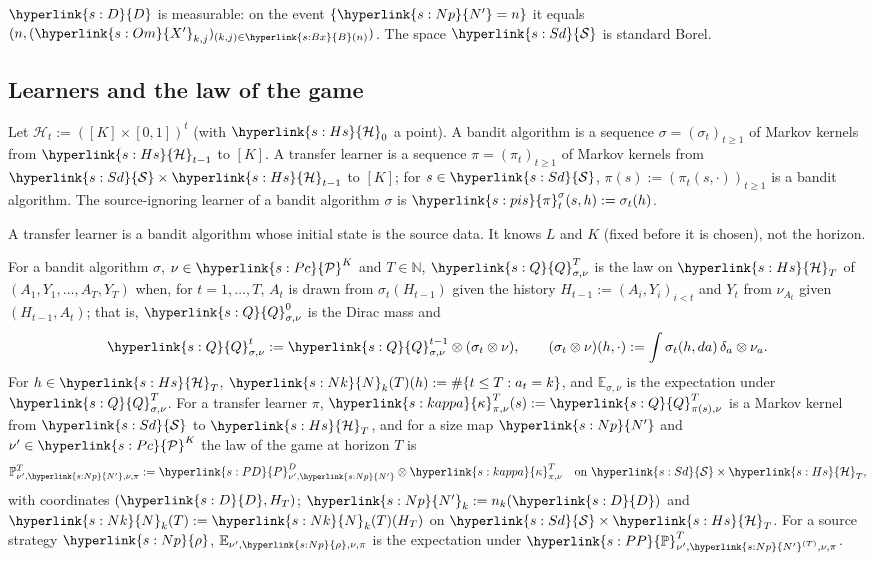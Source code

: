 \documentclass[11pt]{article}
\newcommand{\dt}[1]{\hypertarget{#1}{}}
\newcommand{\sy}[2]{\hyperlink{#1}{#2}}
\newcommand{\E}{\mathbb{E}}
\newcommand{\PP}{\sy{s:PP}{\mathbb{P}}}
\newcommand{\N}{\mathbb{N}}
\newcommand{\Pc}{\sy{s:Pc}{\mathcal{P}}}
\newcommand{\Sd}{\sy{s:Sd}{\mathcal{S}}}
\newcommand{\Bx}{\sy{s:Bx}{B}}
\newcommand{\Hs}{\sy{s:Hs}{\mathcal{H}}}
\newcommand{\Np}{\sy{s:Np}{N'}}
\newcommand{\rhos}{\sy{s:Np}{\rho}}
\newcommand{\Dd}{\sy{s:D}{D}}
\newcommand{\PD}{\sy{s:PD}{P}^{D}}
\newcommand{\Q}{\sy{s:Q}{Q}}
\newcommand{\kap}{\sy{s:kappa}{\kappa}}
\newcommand{\Nc}{\sy{s:Nk}{N}}
\newcommand{\Xp}{\sy{s:Om}{X'}}
\newcommand{\pis}{\sy{s:pis}{\pi}^{\sigma}}
\begin{document}
$\Dd$ is measurable: on the event $\{\Np=n\}$ it equals $(n,(\Xp_{k,j})_{(k,j)\in\Bx(n)})$. The space
$\Sd$ is standard Borel.

\subsection{Learners and the law of the game}\label{sec:setting-game}

\begin{definition}\label{def:learner}
Let \dt{s:Hs}$\mathcal H_t:=([K]\times[0,1])^{t}$ (with $\Hs_0$ a point). A bandit algorithm is a
sequence $\sigma=(\sigma_t)_{t\ge1}$ of Markov kernels from $\Hs_{t-1}$ to $[K]$. A transfer learner
is a sequence $\pi=(\pi_t)_{t\ge1}$ of Markov kernels from $\Sd\times\Hs_{t-1}$ to $[K]$; for
$s\in\Sd$, $\pi(s):=(\pi_t(s,\cdot))_{t\ge1}$ is a bandit algorithm. The source-ignoring learner of a
bandit algorithm $\sigma$ is\dt{s:pis} $\pis_t(s,h):=\sigma_t(h)$.
\end{definition}

A transfer learner is a bandit algorithm whose initial state is the source data. It knows $L$ and
$K$ (fixed before it is chosen), not the horizon.

\begin{definition}\label{def:game}
For a bandit algorithm $\sigma$, $\nu\in\Pc^K$ and $T\in\N$,\dt{s:Q} $\Q^T_{\sigma,\nu}$ is the law on $\Hs_T$
of $(A_1,Y_1,\dots,A_T,Y_T)$ when, for $t=1,\dots,T$, $A_t$ is drawn from $\sigma_t(H_{t-1})$ given
the history $H_{t-1}:=(A_i,Y_i)_{i<t}$ and $Y_t$ from $\nu_{A_t}$ given $(H_{t-1},A_t)$; that is,
$\Q^0_{\sigma,\nu}$ is the Dirac mass and
\begin{equation*}
\Q^t_{\sigma,\nu}:=\Q^{t-1}_{\sigma,\nu}\otimes(\sigma_t\otimes\nu),\qquad
(\sigma_t\otimes\nu)(h,\cdot):=\int\sigma_t(h,da)\,\delta_a\otimes\nu_a.
\end{equation*}
For $h\in\Hs_T$,\dt{s:Nk} $\Nc_k(T)(h):=\#\{t\le T:a_t=k\}$, and $\E_{\sigma,\nu}$ is the expectation under
$\Q^T_{\sigma,\nu}$. For a transfer learner $\pi$,\dt{s:kappa} $\kap^T_{\pi,\nu}(s):=\Q^T_{\pi(s),\nu}$ is a Markov
kernel from $\Sd$ to $\Hs_T$, and for a size map $\Np$ and $\nu'\in\Pc^K$ the law of the game at
horizon $T$ is\dt{s:PP}
\begin{equation*}
\mathbb P^T_{\nu',\Np,\nu,\pi}:=\PD_{\nu',\Np}\otimes\kap^T_{\pi,\nu}\quad\text{on }\Sd\times\Hs_T,
\end{equation*}
with coordinates $(\Dd,H_T)$; $\Np_k:=n_k(\Dd)$ and $\Nc_k(T):=\Nc_k(T)(H_T)$ on $\Sd\times\Hs_T$. For a
source strategy $\rhos$, $\E_{\nu',\rhos,\nu,\pi}$ is the expectation under
$\PP^T_{\nu',\Np^{(T)},\nu,\pi}$.
\end{definition}
\end{document}
